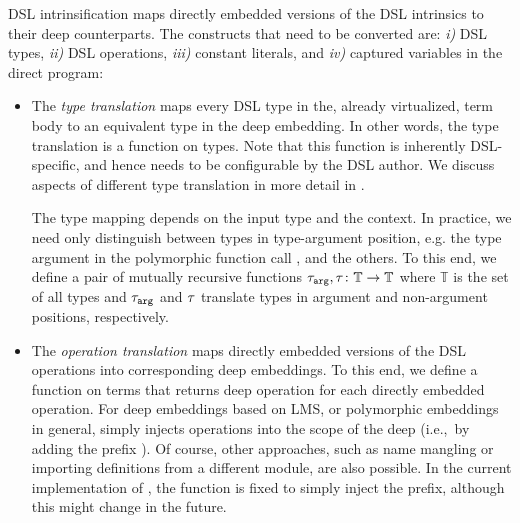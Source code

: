 DSL intrinsification maps directly embedded versions
of the DSL intrinsics to their deep counterparts.  The constructs that
need to be converted are: \emph{i)} DSL types, \emph{ii)} DSL
operations, \emph{iii)} constant literals, and \emph{iv)} captured
variables in the direct program:
\begin{itemize}
\item The \emph{type translation} maps every DSL type in the, already
  virtualized, term body to an equivalent type in the deep embedding.
  In other words, the type translation is a function on
  types.  Note that this function is inherently DSL-specific, and
  hence needs to be configurable by the DSL author.  We discuss
   aspects of different type translation in more detail in
  .


  The type mapping depends on the input type and the context. In
  practice, we need only distinguish between types in type-argument
  position, e.g. the type argument  in the polymorphic
  function call , and the others.  To this end, we
  define a pair of mutually recursive functions $\ttarg, \ttother
  \colon \mathbb{T} \rightarrow \mathbb{T}$ where $\mathbb{T}$ is the
  set of all types and $\ttarg$ and $\ttother$ translate types in
  argument and non-argument positions, respectively.


\item The \emph{operation translation} maps directly embedded versions of the
DSL operations into corresponding deep embeddings.  To this end, we define a
function  on terms that returns deep operation for each directly
embedded operation. For deep embeddings based on LMS, or polymorphic
embeddings~\cite{hofer_polymorphic_2008} in general,  simply injects
operations into the scope of the deep \edsl (i.e.,\ by adding the prefix
). Of course, other approaches, such as name mangling or importing
definitions from a different module, are also possible. In the current
implementation of \tool, the  function is fixed to simply inject the
 prefix, although this might change in the future.


\end{itemize}
